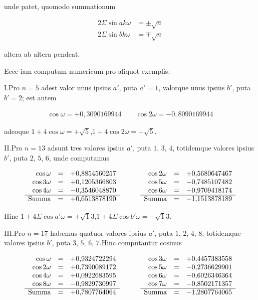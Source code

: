 %
unde patet, quomodo summationum

\[
\begin{aligned}
2\Sigma\sin ak\omega&=\pm\surd n\\
2\Sigma\sin bk\omega&=\mp\surd n
\end{aligned}
\]

altera ab altera pendeat.


Ecce iam computum numericum pro aliquot exemplis:

I.\quad Pro $n=5$ adest valor unus ipsius $a'$, puta $a'=1$, valorque unus ipsius $b'$, puta $b'=2$; est autem

\[
\begin{aligned}
\cos\omega=+0{,}3090169944\qquad\cos2\omega=-0{,}8090169944
\end{aligned}
\]

adeoque $1+4\cos\omega=+\surd5$,\quad $1+4\cos2\omega=-\surd5$.

II.\quad Pro $n=13$ adsunt tres valores ipsius $a'$, puta $1$, $3$, $4$, totidemque valores ipsius $b'$, puta $2$, $5$, $6$, unde computamus

{\small\setlength{\arraycolsep}{2.5pt}\renewcommand{\arraystretch}{1.15}
\[
\begin{array}{rclcrcl}
\cos\omega&=&+0{,}8854560257&\qquad&\cos2\omega&=&+0{,}5680647467\\
\cos3\omega&=&+0{,}1205366803&\qquad&\cos5\omega&=&-0{,}7485107482\\
\cos4\omega&=&-0{,}3546048870&\qquad&\cos6\omega&=&-0{,}9709418174\\\cline{1-3}\cline{5-7}
\text{Summa}&=&+0{,}6513878190&\qquad&\text{Summa}&=&-1{,}1513878189
\end{array}
\]
}

Hinc $1+4\Sigma\cos a'\omega=+\surd13$,\quad $1+4\Sigma\cos b'\omega=-\surd13$.

III.\quad Pro $n=17$ habemus quatuor valores ipsius $a'$, puta $1$, $2$, $4$, $8$, totidemque valores ipsius $b'$, puta $3$, $5$, $6$, $7$.\quad Hinc computantur cosinus

{\small\setlength{\arraycolsep}{2.5pt}\renewcommand{\arraystretch}{1.15}
\[
\begin{array}{rclcrcl}
\cos\omega&=&+0{,}9324722294&\qquad&\cos3\omega&=&+0{,}4457383558\\
\cos2\omega&=&+0{,}7390089172&\qquad&\cos5\omega&=&-0{,}2736629901\\
\cos4\omega&=&+0{,}0922683595&\qquad&\cos6\omega&=&-0{,}6026346364\\
\cos8\omega&=&-0{,}9829730997&\qquad&\cos7\omega&=&-0{,}8502171357\\\cline{1-3}\cline{5-7}
\text{Summa}&=&+0{,}7807764064&\qquad&\text{Summa}&=&-1{,}2807764065
\end{array}
\]
}

